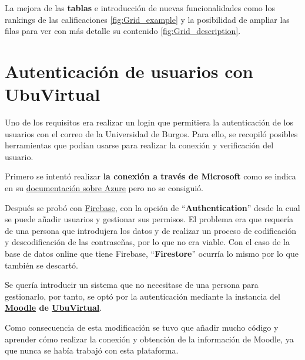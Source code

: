 
La mejora de las \textbf{tablas} e introducción de nuevas funcionalidades como los rankings de las calificaciones \ref{fig:Grid_example} y la posibilidad de ampliar las filas para ver con más detalle su contenido \ref{fig:Grid_description}.


\section{Autenticación de usuarios con UbuVirtual}
Uno de los requisitos era realizar un login que permitiera la autenticación de los usuarios con el correo de la Universidad de Burgos. Para ello, se recopiló posibles herramientas que podían usarse para realizar la conexión y verificación del usuario.

Primero se intentó realizar \textbf{la conexión a través de Microsoft} como se indica en su \href{https://docs.microsoft.com/en-us/azure/active-directory/develop/quickstart-v2-java-webapp}{documentación sobre Azure} pero no se consiguió.

Después se probó con \href{https://firebase.google.com/}{Firebase}, con la opción de ``\textbf{Authentication}'' desde la cual se puede añadir usuarios y gestionar sus permisos. El problema era que requería de una persona que introdujera los datos y de realizar un proceso de codificación y descodificación de las contraseñas, por lo que no era viable. Con el caso de la base de datos online que tiene Firebase, ``\textbf{Firestore}'' ocurría lo mismo por lo que también se descartó.  

Se quería introducir un sistema que no necesitase de una persona para gestionarlo, por tanto, se optó por la autenticación mediante la instancia del \textbf{\href{https://moodle.org/}{Moodle} de \href{https://ubuvirtual.ubu.es/}{UbuVirtual}}. 

Como consecuencia de esta modificación se tuvo que añadir mucho código y aprender cómo realizar la conexión y obtención de la información de Moodle, ya que nunca se había trabajó con esta plataforma.
